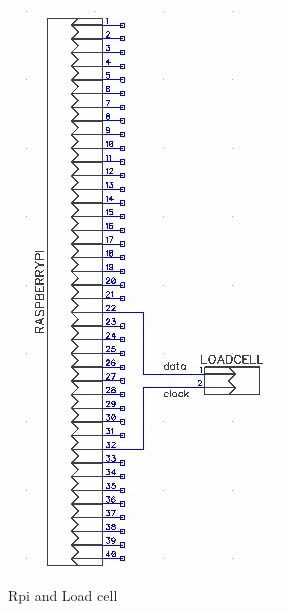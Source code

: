 \documentclass[a4paper,12pt,oneside]{book}
\begin{document}
\begin{figure}[!htb]
\includegraphics[width=\linewidth]{connection2.jpg}
\caption{Rpi and Load cell}
\endminipage\hfill
{}

\end{figure}
\end{document}
